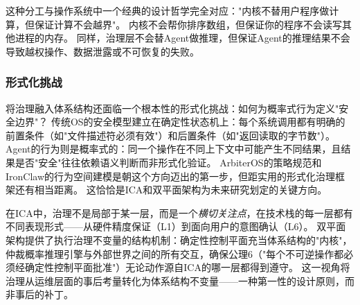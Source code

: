 这种分工与操作系统中一个经典的设计哲学完全对应："内核不替用户程序做计算，但保证计算不会越界"\cite{ostep_2023}。
内核不会帮你排序数组，但保证你的程序不会读写其他进程的内存。
同样，治理层不会替Agent做推理，但保证Agent的推理结果不会导致越权操作、数据泄露或不可恢复的失败。

\subsubsection{形式化挑战}
将治理融入体系结构还面临一个根本性的形式化挑战：如何为概率式行为定义"安全边界"？
传统OS的安全模型建立在确定性状态机上：每个系统调用都有明确的前置条件（如"文件描述符必须有效"）和后置条件（如"返回读取的字节数"）。
Agent的行为则是概率式的：同一个操作在不同上下文中可能产生不同结果，且结果是否"安全"往往依赖语义判断而非形式化验证。
ArbiterOS\cite{arbiteros2025}的策略规范和IronClaw\cite{ironclaw2025}的行为空间建模是朝这个方向迈出的第一步，但距实用的形式化治理框架还有相当距离。
这恰恰是ICA和双平面架构为未来研究划定的关键方向。

在ICA中，治理不是局部于某一层，而是一个\emph{横切关注点}，在技术栈的每一层都有不同表现形式——从硬件精度保证（L1）到面向用户的意图确认（L6）。
双平面架构提供了执行治理不变量的结构机制：确定性控制平面充当体系结构的"内核"，仲裁概率推理引擎与外部世界之间的所有交互，确保公理6（"每个不可逆操作都必须经确定性控制平面批准"）无论动作源自ICA的哪一层都得到遵守。
这一视角将治理从运维层面的事后考量转化为体系结构不变量——一种第一性的设计原则，而非事后的补丁。

